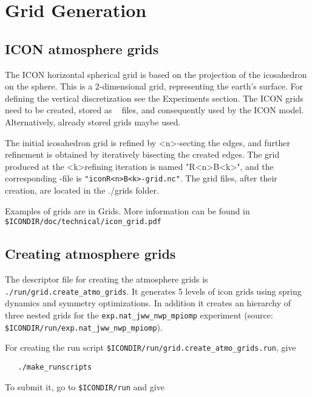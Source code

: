 \section{Grid Generation}
\label{chap:UG_grid_generation}
\subsection{ICON atmosphere grids}

The ICON horizontal spherical grid is based on the projection of the icosahedron on the sphere. This is a 2-dimensional grid, representing the earth's surface. For defining the vertical discretization see the Experiments section. The ICON grids need to be created, stored as \netcdf~ files, and consequently used by the ICON model. Alternatively, already stored grids maybe used.

The initial icosahedron grid is refined by \textless n\textgreater -secting the edges, and further refinement is obtained by iteratively bisecting the created edges. The grid produced at the \textless k\textgreater refining iteration is named "R\textless n\textgreater B\textless k\textgreater", and the corresponding \netcdf -file is \verb+"iconR<n>B<k>-grid.nc"+. The grid files, after their creation, are located in the ./grids folder.

Examples of grids are in Grids. More information can be found in\\ 
\verb+$ICONDIR/doc/technical/icon_grid.pdf+

\subsection{Creating atmosphere grids}

The descriptor file for creating the atmosphere grids is \verb+./run/grid.create_atmo_grids+. It generates 5 levels of icon grids using spring dynamics and symmetry optimizations. In addition it creates an hierarchy of three nested grids for the \verb+exp.nat_jww_nwp_mpiomp+ experiment (source: \verb+$ICONDIR/run/exp.nat_jww_nwp_mpiomp+).

For creating the run script \verb+$ICONDIR/run/grid.create_atmo_grids.run+, give

\begin{small}
  \begin{verbatim}
   ./make_runscripts
  \end{verbatim}
\end{small}

To submit it, go to \verb+$ICONDIR/run+ and give

